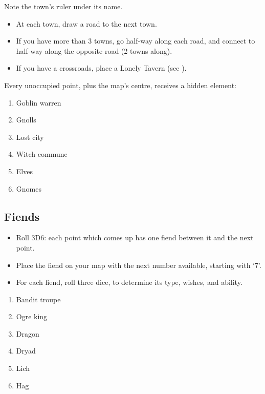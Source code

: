 \begin{multicols}{2}
Note the town's ruler under its name.


\begin{itemize}
\item
  At each town, draw a road to the next town.
\item
  If you have more than 3 towns, go half-way along each road, and
  connect to half-way along the opposite road (2 towns along).
\item
  If you have a crossroads, place a Lonely Tavern (see ).
\end{itemize}


Every unoccupied point, plus the map's centre, receives a hidden
element:

\begin{enumerate}
\item
  Goblin warren
\item
  Gnolls
\item
  Lost city
\item
  Witch commune
\item
  Elves
\item
  Gnomes
\end{enumerate}

\subsection{Fiends}


\begin{itemize}
\item
  Roll 3D6: each point which comes up has one fiend between it and the
  next point.
\item
  Place the fiend on your map with the next number available, starting
  with `7'.
\item
  For each fiend, roll three dice, to determine its type, wishes, and
  ability.
\end{itemize}


\begin{enumerate}
\item
  Bandit troupe
\item
  Ogre king
\item
  Dragon
\item
  Dryad
\item
  Lich
\item
  Hag
\end{enumerate}


\end{multicols}
